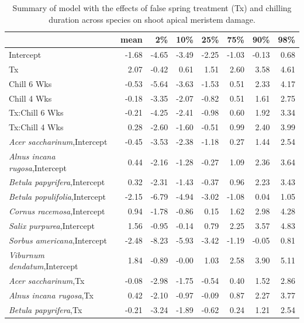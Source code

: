 \documentclass{article}\usepackage[]{graphicx}\usepackage[]{color}
\begin{document}
\newpage
\begin{longtable}{lrrrrrrr}
\caption{Summary of model with the effects of false spring treatment (Tx) and chilling duration across species on shoot apical meristem damage.} \\ 
  \hline
 & mean & 2\% & 10\% & 25\% & 75\% & 90\% & 98\% \\ 
  \hline \endhead  \hline
Intercept & -1.68 & -4.65 & -3.49 & -2.25 & -1.03 & -0.13 & 0.68 \\ 
  Tx & 2.07 & -0.42 & 0.61 & 1.51 & 2.60 & 3.58 & 4.61 \\ 
  Chill 6 Wks & -0.53 & -5.64 & -3.63 & -1.53 & 0.51 & 2.33 & 4.17 \\ 
  Chill 4 Wks & -0.18 & -3.35 & -2.07 & -0.82 & 0.51 & 1.61 & 2.75 \\ 
  Tx:Chill 6 Wks & -0.21 & -4.25 & -2.41 & -0.98 & 0.60 & 1.92 & 3.34 \\ 
  Tx:Chill 4 Wks & 0.28 & -2.60 & -1.60 & -0.51 & 0.99 & 2.40 & 3.99 \\ 
  \textit{Acer saccharinum},Intercept & -0.45 & -3.53 & -2.38 & -1.18 & 0.27 & 1.44 & 2.54 \\ 
  \textit{Alnus incana rugosa},Intercept & 0.44 & -2.16 & -1.28 & -0.27 & 1.09 & 2.36 & 3.64 \\ 
  \textit{Betula papyrifera},Intercept & 0.32 & -2.31 & -1.43 & -0.37 & 0.96 & 2.23 & 3.43 \\ 
  \textit{Betula populifolia},Intercept & -2.15 & -6.79 & -4.94 & -3.02 & -1.08 & 0.04 & 1.05 \\ 
  \textit{Cornus racemosa},Intercept & 0.94 & -1.78 & -0.86 & 0.15 & 1.62 & 2.98 & 4.28 \\ 
  \textit{Salix purpurea},Intercept & 1.56 & -0.95 & -0.14 & 0.79 & 2.25 & 3.57 & 4.83 \\ 
  \textit{Sorbus americana},Intercept & -2.48 & -8.23 & -5.93 & -3.42 & -1.19 & -0.05 & 0.81 \\ 
  \textit{Viburnum dendatum},Intercept & 1.84 & -0.89 & -0.00 & 1.03 & 2.58 & 3.90 & 5.11 \\ 
  \textit{Acer saccharinum},Tx & -0.08 & -2.98 & -1.75 & -0.54 & 0.40 & 1.52 & 2.86 \\ 
  \textit{Alnus incana rugosa},Tx & 0.42 & -2.10 & -0.97 & -0.09 & 0.87 & 2.27 & 3.77 \\ 
  \textit{Betula papyrifera},Tx & -0.21 & -3.24 & -1.89 & -0.62 & 0.24 & 1.21 & 2.54 \\ 

\end{longtable}
\end{document}
